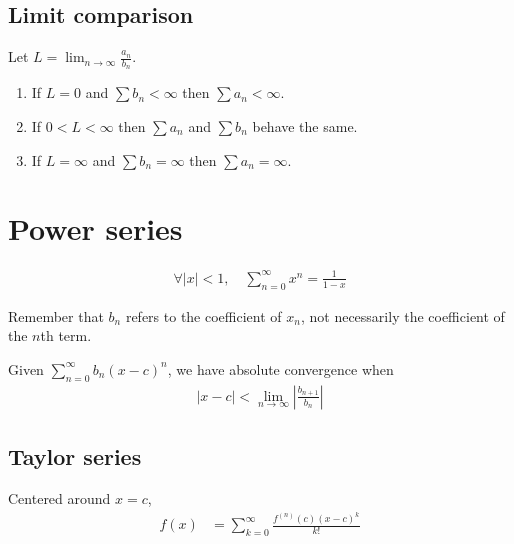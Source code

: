 \documentclass[12pt]{article}
\newcommand{\abs}  [1]{\left|       #1 \right|      }
\begin{document}
\begin{multicols}{2}
\subsection*{Limit comparison}
Let $L = \lim_{n\to\infty} \frac{a_n}{b_n}$.
\begin{enumerate}
    \item If $L=0$ and $\sum b_n < \infty$ then $\sum a_n < \infty$.
    \item If $0<L<\infty$ then $\sum a_n$ and $\sum b_n$ behave the same.
    \item If $L=\infty$ and $\sum b_n = \infty$ then $\sum a_n = \infty$.
\end{enumerate}

\section*{Power series}
\begin{align*}
    \forall \abs{x} < 1,\quad \sum_{n=0}^\infty x^n = \frac{1}{1-x}
\end{align*}

Remember that $b_n$ refers to the coefficient of $x_n$, not necessarily the coefficient of the $n$th term.

Given $\sum_{n=0}^\infty b_n (x-c)^n$, we have absolute convergence when
\begin{align*}
    \abs{x-c} < \lim_{n\to\infty} \abs{\frac{b_{n+1}}{b_n}}
\end{align*}

\subsection*{Taylor series}
Centered around $x=c$,
\begin{align*}
    f(x) &= \sum_{k=0}^\infty \frac{f^{(n)}(c) (x-c)^k}{k!}
\end{align*}

\end{multicols}
\end{document}
